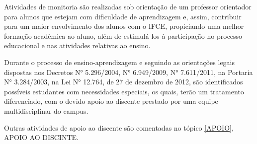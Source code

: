 Atividades de monitoria são realizadas sob orientação de um professor orientador para alunos que estejam com dificuldade de aprendizagem e, assim, contribuir para um maior envolvimento dos alunos com o IFCE, propiciando uma melhor formação acadêmica ao aluno, além de estimulá-los à participação no processo educacional e nas atividades relativas ao ensino.

Durante o processo de ensino-aprendizagem e seguindo as orientações legais dispostas nos Decretos N° 5.296/2004, N° 6.949/2009, N° 7.611/2011, na Portaria N° 3.284/2003, na Lei N° 12.764, de 27 de dezembro de 2012, são identificados possíveis estudantes com necessidades especiais, os quais, terão um tratamento diferenciado, com o devido apoio ao discente prestado por uma equipe multidisciplinar do campus.   

Outras atividades de apoio ao discente são comentadas no tópico \ref{APOIO}, APOIO AO DISCINTE.
